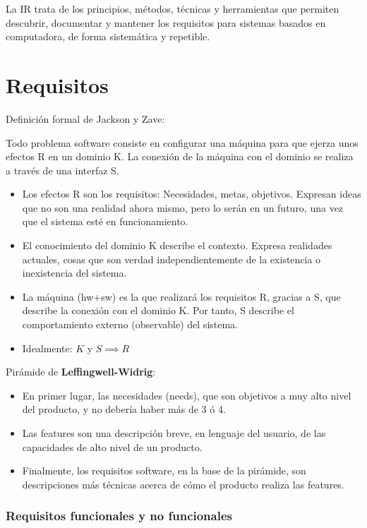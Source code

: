 
La IR trata de los principios, métodos, técnicas y herramientas que
permiten descubrir, documentar y mantener los requisitos para sistemas
basados en computadora, de forma sistemática y repetible.

\section{Requisitos}

Definición formal de Jackson y Zave:

Todo problema software consiste en configurar una máquina para que ejerza unos efectos R en
un dominio K. La conexión de la máquina con el dominio se realiza a través de una interfaz S.

\begin{itemize}[noitemsep]
\item Los efectos R son los requisitos: Necesidades, metas,
  objetivos. Expresan ideas que no son una realidad ahora mismo, pero
  lo serán en un futuro, una vez que el sistema esté en
  funcionamiento.
\item El conocimiento del dominio K describe el contexto. Expresa
  realidades actuales, cosas que son verdad independientemente de la
  existencia o inexistencia del sistema.
\item La máquina (hw+sw) es la que realizará los requisitos R, gracias
  a S, que describe la conexión con el dominio K. Por tanto, S
  describe el comportamiento externo (observable) del sistema.
\item Idealmente: $K$ y $S \implies R$
\end{itemize}

Pirámide de \textbf{Leffingwell-Widrig}:
\begin{itemize}[noitemsep]
\item En primer lugar, las necesidades (needs), que son
objetivos a muy alto nivel del producto, y no debería
haber más de 3 ó 4.
\item Las features son una descripción breve, en lenguaje del
usuario, de las capacidades de alto nivel de un producto.
\item Finalmente, los requisitos software, en la base de la
pirámide, son descripciones más técnicas acerca de cómo
el producto realiza las features.
\end{itemize}


\subsubsection{Requisitos funcionales y no funcionales}
\label{sec:requisitos:funcionales-nofuncionales}

